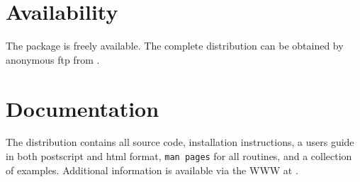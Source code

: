 \section*{Availability}

The  package is freely available.
The complete distribution can be obtained by anonymous ftp from 
.

\section*{Documentation}

The  distribution contains all source code, 
installation instructions,
a users guide in both postscript and html format, 
{\tt man pages} for all routines,
and a collection of examples.
Additional information is available via the WWW at
.

\makeinfo

